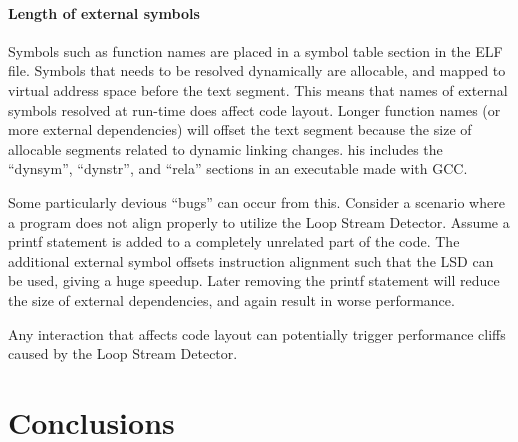 \documentclass[a4paper,11pt,twocolumn,twoside]{article}
\begin{document}
\paragraph{Length of external symbols}
Symbols such as function names are placed in a symbol table section in the ELF file.
Symbols that needs to be resolved dynamically are allocable, and mapped to virtual address space before the text segment. 
This means that names of external symbols resolved at run-time does affect code layout. 
Longer function names (or more external dependencies) will offset the text segment because the size of allocable segments related to dynamic linking changes. 
his includes the “dynsym”, “dynstr”, and “rela” sections in an executable made with GCC.

Some particularly devious “bugs” can occur from this. 
Consider a scenario where a program does not align properly to utilize the Loop Stream Detector. 
Assume a printf statement is added to a completely unrelated part of the code. 
The additional external symbol offsets instruction alignment such that the LSD can be used, giving a huge speedup.
Later removing the printf statement will reduce the size of external dependencies, and again result in worse performance. 

Any interaction that affects code layout can potentially trigger performance cliffs caused by the Loop Stream Detector.


\section{Conclusions}


\onecolumn



\end{document}
